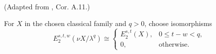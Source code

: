 \begin{definition}
\label{frontier:Literature:e30343a1c6cc}
(Adapted from \cite{BHS}, Cor. A.11.)\par{}

For $X$ in the chosen classical family and $q>0$, choose isomorphisms\[E_2^{s,t,w}(\nu X/\lambda^q)\cong\begin{cases}E_2^{s,t}(X),&0\le t-w<q,\\0,&\text{otherwise}.\end{cases}\]
\end{definition}


